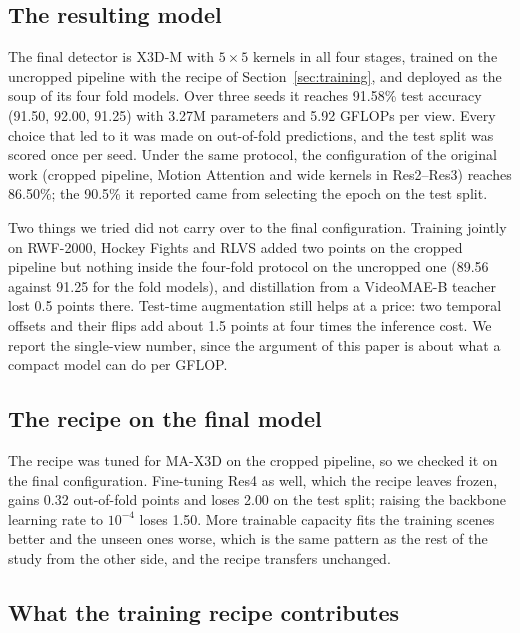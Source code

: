 \documentclass[conference]{IEEEtran}
\begin{document}
\subsection{The resulting model}
\label{sec:final}

The final detector is X3D-M with $5\times5$ kernels in all four stages,
trained on the uncropped pipeline with the recipe of
Section~\ref{sec:training}, and deployed as the soup of its four fold
models. Over three seeds it reaches 91.58\% test accuracy (91.50, 92.00,
91.25) with 3.27M parameters and 5.92 GFLOPs per view. Every choice that
led to it was made on out-of-fold predictions, and the test split was
scored once per seed. Under the same protocol, the configuration of the
original work (cropped pipeline, Motion Attention and wide kernels in
Res2--Res3) reaches 86.50\%; the 90.5\% it reported came from selecting the
epoch on the test split.

Two things we tried did not carry over to the final configuration.
Training jointly on RWF-2000, Hockey Fights and RLVS added two points on
the cropped pipeline but nothing inside the four-fold protocol on the
uncropped one (89.56 against 91.25 for the fold models), and distillation
from a VideoMAE-B teacher lost 0.5 points there. Test-time augmentation
still helps at a price: two temporal offsets and their flips add about 1.5
points at four times the inference cost. We report the single-view number,
since the argument of this paper is about what a compact model can do per
GFLOP.

\subsection{The recipe on the final model}
\label{sec:recipe-clean}

The recipe was tuned for MA-X3D on the cropped pipeline, so we checked it
on the final configuration. Fine-tuning Res4 as well, which the recipe
leaves frozen, gains 0.32 out-of-fold points and loses 2.00 on the test
split; raising the backbone learning rate to $10^{-4}$ loses 1.50. More
trainable capacity fits the training scenes better and the unseen ones
worse, which is the same pattern as the rest of the study from the other
side, and the recipe transfers unchanged.

\subsection{What the training recipe contributes}
\end{document}
